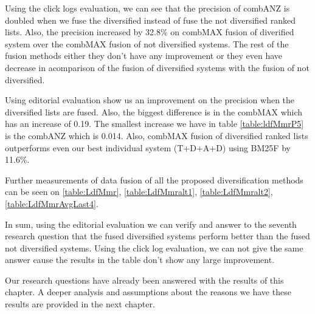 Using the click logs evaluation, we can see that the precision of combANZ is doubled when we fuse the diversified instead of fuse the not diversified ranked lists. Also, the precision increased by 32.8\% on combMAX fusion of diverified system over the combMAX fusion of not diversified systems. The rest of the fusion methods either they don't have any improvement or they even have decrease  in acomparison of the fusion of diversified systems with the fusion of not diversified.

Using editorial evaluation show us an improvement on the precision when the diversified lists are fused. Also, the biggest difference is in the combMAX which has an increase of 0.19. The smallest increase we have in table \ref{table:ldfMmrP5} is the combANZ which is 0.014. Also, combMAX fusion of diversified ranked lists outperforms even our best individual system (T+D+A+D) using BM25F by 11.6\%. 

Further measurements of data fusion of all the proposed diversification methods can be seen on \ref{table:LdfMmr}, \ref{table:LdfMmralt1}, \ref{table:LdfMmralt2}, \ref{table:LdfMmrAvgLast4}.

In sum, using the editorial evaluation we can verify and answer to the seventh research question that the fused diversified systems perform better than the fused not diversified systems. Using the click log evaluation, we can not give the same answer cause the results in the table don't show any large improvement.

Our research questions have already been answered with the results of this chapter. A deeper analysis and assumptions about the reasons we have these results are provided in the next chapter.
